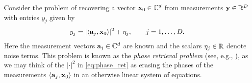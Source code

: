 




Consider the problem of recovering a vector $\mathbf x_0 \in \mathbb{C}^d$ from measurements $\mathbf y \in \mathbb{R}^D$ with entries $y_j$ given by
\begin{equation}
y_j = |\langle \mathbf{a}_j, \mathbf x_0 \rangle|^2 + \eta_j, \quad\quad j = 1,\ldots, D.\label{eq:phase_ret}
\end{equation}
Here the measurement vectors $\mathbf{a}_j\in \mathbb{C}^d$ are known and the scalars $\eta_j \in \mathbb{R}$ denote noise terms.  This problem is known as the \emph{phase retrieval problem} (see, e.g., \cite{millane1990phase, walther1963question}), as we may think of the $|\cdot|^2$ in \eqref{eq:phase_ret} as erasing the phases of the measurements $\langle \mathbf a_j, \mathbf x_0 \rangle$ in an otherwise linear system of equations.

